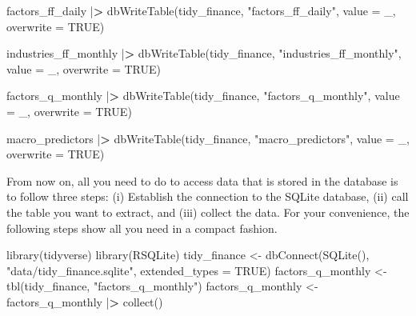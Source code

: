 \documentclass[
]{book}
\newenvironment{Shaded}{\begin{snugshade}}{\end{snugshade}}
\newcommand{\AttributeTok}[1]{\textcolor[rgb]{0.61,0.61,0.61}{#1}}
\newcommand{\ConstantTok}[1]{\textcolor[rgb]{0,0,0}{#1}}
\newcommand{\ErrorTok}[1]{\textcolor[rgb]{0.14,0.14,0.14}{\textbf{#1}}}
\newcommand{\FunctionTok}[1]{\textcolor[rgb]{0,0,0}{#1}}
\newcommand{\NormalTok}[1]{#1}
\newcommand{\OtherTok}[1]{\textcolor[rgb]{0.37,0.37,0.37}{#1}}
\newcommand{\SpecialCharTok}[1]{\textcolor[rgb]{0,0,0}{#1}}
\newcommand{\StringTok}[1]{\textcolor[rgb]{0.5,0.5,0.5}{#1}}
\begin{document}
\begin{Shaded}
\begin{Highlighting}[]
\NormalTok{factors\_ff\_daily }\SpecialCharTok{|}\ErrorTok{\textgreater{}}
  \FunctionTok{dbWriteTable}\NormalTok{(tidy\_finance, }
               \StringTok{"factors\_ff\_daily"}\NormalTok{, }
               \AttributeTok{value =}\NormalTok{ \_, }
               \AttributeTok{overwrite =} \ConstantTok{TRUE}\NormalTok{)}

\NormalTok{industries\_ff\_monthly }\SpecialCharTok{|}\ErrorTok{\textgreater{}}
  \FunctionTok{dbWriteTable}\NormalTok{(tidy\_finance, }
               \StringTok{"industries\_ff\_monthly"}\NormalTok{, }
               \AttributeTok{value =}\NormalTok{ \_, }
               \AttributeTok{overwrite =} \ConstantTok{TRUE}\NormalTok{)}

\NormalTok{factors\_q\_monthly }\SpecialCharTok{|}\ErrorTok{\textgreater{}}
  \FunctionTok{dbWriteTable}\NormalTok{(tidy\_finance, }
               \StringTok{"factors\_q\_monthly"}\NormalTok{, }
               \AttributeTok{value =}\NormalTok{ \_, }
               \AttributeTok{overwrite =} \ConstantTok{TRUE}\NormalTok{)}

\NormalTok{macro\_predictors }\SpecialCharTok{|}\ErrorTok{\textgreater{}}
  \FunctionTok{dbWriteTable}\NormalTok{(tidy\_finance, }
               \StringTok{"macro\_predictors"}\NormalTok{, }
               \AttributeTok{value =}\NormalTok{ \_, }
               \AttributeTok{overwrite =} \ConstantTok{TRUE}\NormalTok{)}
\end{Highlighting}
\end{Shaded}

From now on, all you need to do to access data that is stored in the database is to follow three steps: (i) Establish the connection to the SQLite database, (ii) call the table you want to extract, and (iii) collect the data. For your convenience, the following steps show all you need in a compact fashion.

\begin{Shaded}
\begin{Highlighting}[]
\FunctionTok{library}\NormalTok{(tidyverse)}
\FunctionTok{library}\NormalTok{(RSQLite)}
\NormalTok{tidy\_finance }\OtherTok{\textless{}{-}} \FunctionTok{dbConnect}\NormalTok{(}\FunctionTok{SQLite}\NormalTok{(), }
                          \StringTok{"data/tidy\_finance.sqlite"}\NormalTok{, }
                          \AttributeTok{extended\_types =} \ConstantTok{TRUE}\NormalTok{)}
\NormalTok{factors\_q\_monthly }\OtherTok{\textless{}{-}} \FunctionTok{tbl}\NormalTok{(tidy\_finance, }
                         \StringTok{"factors\_q\_monthly"}\NormalTok{)}
\NormalTok{factors\_q\_monthly }\OtherTok{\textless{}{-}}\NormalTok{ factors\_q\_monthly }\SpecialCharTok{|}\ErrorTok{\textgreater{}} \FunctionTok{collect}\NormalTok{()}
\end{Highlighting}
\end{Shaded}
\end{document}
